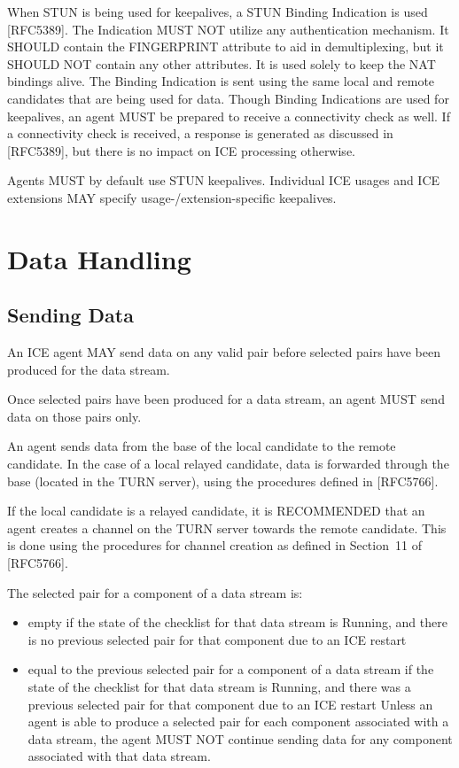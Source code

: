 \documentclass{article}
\begin{document}
When STUN is being used for keepalives, a STUN Binding Indication is used [RFC5389].  The Indication MUST NOT utilize any authentication mechanism.  It SHOULD contain the FINGERPRINT attribute to aid in demultiplexing, but it SHOULD NOT contain any other attributes.  It is used solely to keep the NAT bindings alive.  The Binding Indication is sent using the same local and remote candidates that are being used for data.  Though Binding Indications are used for keepalives, an agent MUST be prepared to receive a connectivity check as well.  If a connectivity check is received, a response is generated as discussed in [RFC5389], but there is no impact on ICE processing otherwise.

Agents MUST by default use STUN keepalives.  Individual ICE usages and ICE extensions MAY specify usage-/extension-specific keepalives.

\section{Data Handling}

\subsection{Sending Data}

An ICE agent MAY send data on any valid pair before selected pairs have been produced for the data stream.

Once selected pairs have been produced for a data stream, an agent MUST send data on those pairs only.

An agent sends data from the base of the local candidate to the remote candidate.  In the case of a local relayed candidate, data is forwarded through the base (located in the TURN server), using the procedures defined in [RFC5766].

If the local candidate is a relayed candidate, it is RECOMMENDED that an agent creates a channel on the TURN server towards the remote candidate.  This is done using the procedures for channel creation as defined in Section~11 of [RFC5766].

The selected pair for a component of a data stream is:

\begin{itemize}
\item empty if the state of the checklist for that data stream is Running, and there is no previous selected pair for that component due to an ICE restart
\item equal to the previous selected pair for a component of a data stream if the state of the checklist for that data stream is Running, and there was a previous selected pair for that component due to an ICE restart
Unless an agent is able to produce a selected pair for each component associated with a data stream, the agent MUST NOT continue sending data for any component associated with that data stream.

\end{itemize}
\end{document}
